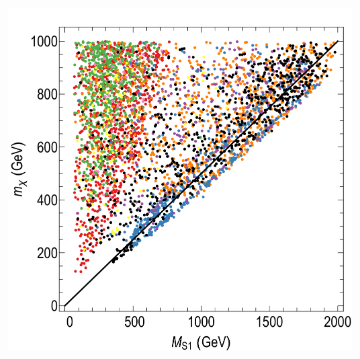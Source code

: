 \begin{figure}[t]
\begin{subfigure}[t]{0.43\textwidth}
\label{fig:scan1b}
\end{subfigure}
\vspace{0.5ex}
\begin{subfigure}[t]{0.43\textwidth}
\includegraphics[width=\textwidth]{texinputs/05_relic/figures/relic_scalar/MS1_mDM3.pdf}
\label{fig:scan1c}
\end{subfigure}
\hspace{1em}
\begin{subfigure}[t]{0.43\textwidth}

\end{subfigure}
\end{figure}
